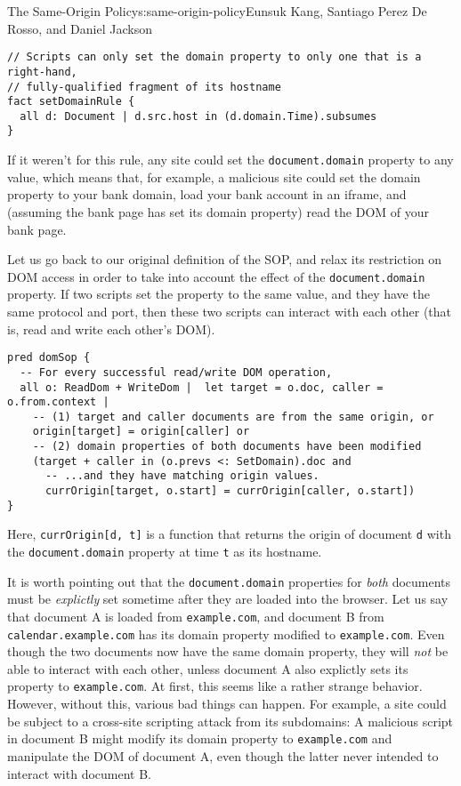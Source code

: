 \begin{aosachapter}{The Same-Origin Policy}{s:same-origin-policy}{Eunsuk Kang, Santiago Perez De Rosso, and Daniel Jackson}
\begin{verbatim}
// Scripts can only set the domain property to only one that is a right-hand,
// fully-qualified fragment of its hostname
fact setDomainRule {
  all d: Document | d.src.host in (d.domain.Time).subsumes
}
\end{verbatim}

If it weren't for this rule, any site could set the
\texttt{document.domain} property to any value, which means that, for
example, a malicious site could set the domain property to your bank
domain, load your bank account in an iframe, and (assuming the bank page
has set its domain property) read the DOM of your bank page.

Let us go back to our original definition of the SOP, and relax its
restriction on DOM access in order to take into account the effect of
the \texttt{document.domain} property. If two scripts set the property
to the same value, and they have the same protocol and port, then these
two scripts can interact with each other (that is, read and write each
other's DOM).

\begin{verbatim}
pred domSop {
  -- For every successful read/write DOM operation,
  all o: ReadDom + WriteDom |  let target = o.doc, caller = o.from.context |
    -- (1) target and caller documents are from the same origin, or
    origin[target] = origin[caller] or
    -- (2) domain properties of both documents have been modified
    (target + caller in (o.prevs <: SetDomain).doc and
      -- ...and they have matching origin values.
      currOrigin[target, o.start] = currOrigin[caller, o.start])
}
\end{verbatim}

Here, \texttt{currOrigin{[}d, t{]}} is a function that returns the
origin of document \texttt{d} with the \texttt{document.domain} property
at time \texttt{t} as its hostname.

It is worth pointing out that the \texttt{document.domain} properties
for \emph{both} documents must be \emph{explictly} set sometime after
they are loaded into the browser. Let us say that document A is loaded
from \texttt{example.com}, and document B from
\texttt{calendar.example.com} has its domain property modified to
\texttt{example.com}. Even though the two documents now have the same
domain property, they will \emph{not} be able to interact with each
other, unless document A also explictly sets its property to
\texttt{example.com}. At first, this seems like a rather strange
behavior. However, without this, various bad things can happen. For
example, a site could be subject to a cross-site scripting attack from
its subdomains: A malicious script in document B might modify its domain
property to \texttt{example.com} and manipulate the DOM of document A,
even though the latter never intended to interact with document B.


\end{aosachapter}
